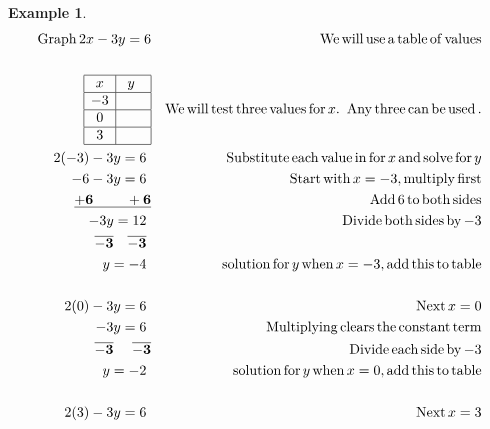 \documentclass[12pt]{book}
\theoremstyle{definition}
\newtheorem{example}{Example}
\newcommand{\tmop}[1]{\ensuremath{\operatorname{#1}}}
\begin{document}
\begin{example}\label{Lin45}  
  \begin{eqnarray*}
    \tmop{Graph} 2 x - 3 y = 6 &  & \tmop{We} \tmop{will} \tmop{use} \tmop{a}
    \tmop{table} \tmop{of} \tmop{values}\\
    &  & \\
    \begin{array}{|c|c|}
      \hline
      x & ~y~~\\
      \hline
      - 3 & \\
      \hline
      0 & \\
      \hline
      3 & \\
      \hline
    \end{array} &  & \tmop{We} \tmop{will} \tmop{test} \tmop{three}
    \tmop{values} \tmop{for} x. \tmop{~Any} \tmop{three} \tmop{can} \tmop{be}
    \tmop{used}.\\
		2 (- 3) - 3 y = 6~ &  & \tmop{Substitute} \tmop{each} \tmop{value}
    \tmop{in} \tmop{for} x \tmop{and} \tmop{solve} \tmop{for} y\\
    - 6 - 3 y = 6~ &  & \tmop{Start} \tmop{with} x = - 3, \tmop{multiply}
    \tmop{first}\\
    \bf{\underline{+ 6 ~~~~~~~+ 6}} &  & \tmop{Add} 6 \tmop{to} \tmop{both} \tmop{sides}\\
    - 3 y = 12~ &  & \tmop{Divide} \tmop{both} \tmop{sides} \tmop{by} - 3\\
    \bf{\overline{- 3} ~~~ \overline{- 3}}~ &  & \\
    y = - 4~ &  & \tmop{solution} \tmop{for} y \tmop{when} x = - 3, \tmop{add}
    \tmop{this} \tmop{to} \tmop{table}\\
    &  & \\
    2 (0) - 3 y = 6~ &  & \tmop{Next} x = 0\\
    - 3 y = 6~ &  & \tmop{Multiplying} \tmop{clears} \tmop{the} \tmop{constant}
    \tmop{term}\\
    \bf{\overline{- 3} ~~~~ \overline{- 3}} &  & \tmop{Divide} \tmop{each} \tmop{side}
    \tmop{by} - 3\\
    y = - 2~ &  & \tmop{solution} \tmop{for} y \tmop{when} x = 0, \tmop{add}
    \tmop{this} \tmop{to} \tmop{table}\\
    &  & \\
    2 (3) - 3 y = 6~ &  & \tmop{Next} x = 3\\

\end{eqnarray*}
\end{example}
\end{document}
